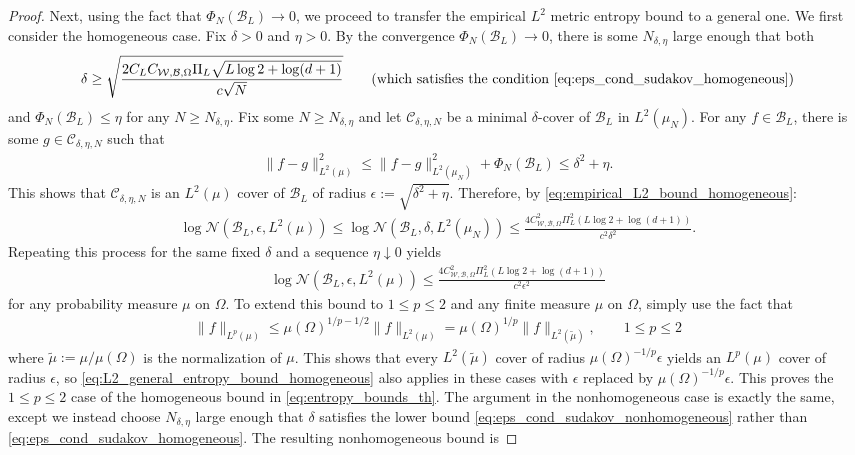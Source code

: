 \documentclass{article}
\def\cB{{\mathcal{B}}}
\def\cC{{\mathcal{C}}}
\def\cN{{\mathcal{N}}}
\def\cW{{\mathcal{W}}}
\begin{document}
\begin{appendices}
\begin{proof}
    Next, using the fact that $\Phi_N(\cB_L) \to 0$, we proceed to transfer the empirical $L^2$ metric entropy bound to a general one. We first consider the homogeneous case. Fix $\delta > 0$ and $\eta > 0$. By the convergence $\Phi_N(\cB_L) \to 0$, there is some $N_{\delta,\eta}$ large enough that both
    \begin{align} \label{eq:delta_cond_sudakov_homogeneous}
        \delta \geq \sqrt{\frac{2 C_L C_{\cW, \cB, \Omega} \Pi_L \sqrt{L \log 2 + \log(d+1)}}{c \sqrt{N}}} \qquad \textrm{(which satisfies the condition \eqref{eq:eps_cond_sudakov_homogeneous})}
    \end{align}
    and $\Phi_N(\cB_L) \leq \eta$ for any $N \geq N_{\delta, \eta}$. Fix some $N \geq N_{\delta,\eta}$ and let $\cC_{\delta,\eta,N}$ be a minimal $\delta$-cover of $\cB_L$ in $L^2(\mu_N)$. For any $f \in \cB_L$, there is some $g \in \cC_{\delta,\eta,N}$ such that
    \begin{align}
        \| f - g \|_{L^2(\mu)}^2 \leq \| f - g \|_{L^2(\mu_N)}^2 + \Phi_N(\cB_L) \leq \delta^2 + \eta.
    \end{align}
    This shows that $\cC_{\delta,\eta,N}$ is an $L^2(\mu)$ cover of $\cB_L$ of radius $\epsilon := \sqrt{\delta^2 + \eta}$. Therefore, by \eqref{eq:empirical_L2_bound_homogeneous}:
    \begin{align}
        \log \cN(\cB_L, \epsilon, L^2(\mu)) \leq \log \cN(\cB_L, \delta, L^2(\mu_N)) \leq \frac{4 C_{\cW, \cB, \Omega}^2 \Pi_L^2 \left( L \log 2 + \log(d+1) \right)}{c^2 \delta^2}.
    \end{align}
    Repeating this process for the same fixed $\delta$ and a sequence $\eta \downarrow 0$ yields
    \begin{align} \label{eq:L2_general_entropy_bound_homogeneous}
        \log \cN(\cB_L, \epsilon, L^2(\mu)) \leq \frac{4 C_{\cW, \cB, \Omega}^2 \Pi_L^2 \left( L \log 2 + \log(d+1) \right)}{c^2 \epsilon^2}
    \end{align}
    for any probability measure $\mu$ on $\Omega$.  To extend this bound to $1 \leq p \leq 2$ and any finite measure $\mu$ on $\Omega$, simply use the fact that
    \begin{align}
        \| f \|_{L^p(\mu)} \leq  \mu(\Omega)^{1/p-1/2} \| f \|_{L^2(\mu)} = \mu(\Omega)^{1/p}  \| f \|_{L^2(\tilde{\mu})}, \qquad 1 \leq p \leq 2
    \end{align}
    where $\tilde{\mu} := \mu/\mu(\Omega)$ is the normalization of $\mu$. This shows that every $L^2(\tilde{\mu})$ cover of radius $\mu(\Omega)^{-1/p} \epsilon$ yields an $L^p(\mu)$ cover of radius $\epsilon$, so \eqref{eq:L2_general_entropy_bound_homogeneous} also applies in these cases with $\epsilon$ replaced by $\mu(\Omega)^{-1/p} \epsilon$. This proves the $1 \leq p \leq 2$ case of the homogeneous bound in \eqref{eq:entropy_bounds_th}. The argument in the nonhomogeneous case is exactly the same, except we instead choose $N_{\delta,\eta}$ large enough that $\delta$ satisfies the lower bound \eqref{eq:eps_cond_sudakov_nonhomogeneous} rather than \eqref{eq:eps_cond_sudakov_homogeneous}. The resulting nonhomogeneous bound is

\end{proof}
\end{appendices}
\end{document}
